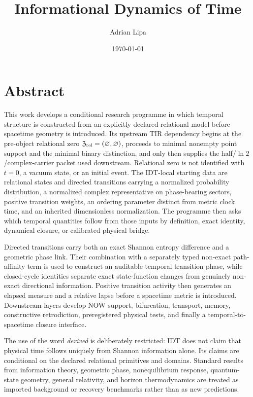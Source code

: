 \documentclass[11pt]{book}
\title{Informational Dynamics of Time}
\author{Adrian Lipa}
\date{\today}
\begin{document}
\frontmatter
\maketitle
\chapter*{Abstract}

This work develops a conditional research programme in which temporal structure is constructed from an explicitly declared relational model before spacetime geometry is introduced. Its upstream TIR dependency begins at the pre-object relational zero \(\mathfrak Z_{\rm rel}=(\varnothing,\varnothing)\), proceeds to minimal nonempty point support and the minimal binary distinction, and only then supplies the half/\(\ln2\)/complex-carrier packet used downstream. Relational zero is not identified with \(t=0\), a vacuum state, or an initial event. The IDT-local starting data are relational states and directed transitions carrying a normalized probability distribution, a normalized complex representative on phase-bearing sectors, positive transition weights, an ordering parameter distinct from metric clock time, and an inherited dimensionless normalization. The programme then asks which temporal quantities follow from those inputs by definition, exact identity, dynamical closure, or calibrated physical bridge.

Directed transitions carry both an exact Shannon entropy difference and a geometric phase link. Their combination with a separately typed non-exact path-affinity term is used to construct an auditable temporal transition phase, while closed-cycle identities separate exact state-function changes from genuinely non-exact directional information. Positive transition activity then generates an elapsed measure and a relative lapse before a spacetime metric is introduced. Downstream layers develop NOW support, bifurcation, transport, memory, constructive retrodiction, preregistered physical tests, and finally a temporal-to-spacetime closure interface.

The use of the word \emph{derived} is deliberately restricted: IDT does not claim that physical time follows uniquely from Shannon information alone. Its claims are conditional on the declared relational primitives and domains. Standard results from information theory, geometric phase, nonequilibrium response, quantum-state geometry, general relativity, and horizon thermodynamics are treated as imported background or recovery benchmarks rather than as new predictions.
\end{document}
